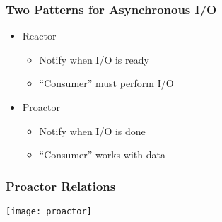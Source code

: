 \begin{frame}
  \frametitle{Two Patterns for Asynchronous I/O}
  \begin{itemize}
    \item{Reactor}\pause{}
      \begin{itemize}
        \item{Notify when I/O is ready}
        \item{``Consumer'' must perform I/O}
      \end{itemize}\pause{}
    \item{Proactor}\pause{}
      \begin{itemize}
        \item{Notify when I/O is done}
        \item{``Consumer'' works with data}
      \end{itemize}\pause{}
  \end{itemize}
\end{frame}

\begin{frame}
  \frametitle{Proactor Relations}
  \vfill{}
  \begin{center}
    \texttt{[image: proactor]}
  \end{center}
\end{frame}
